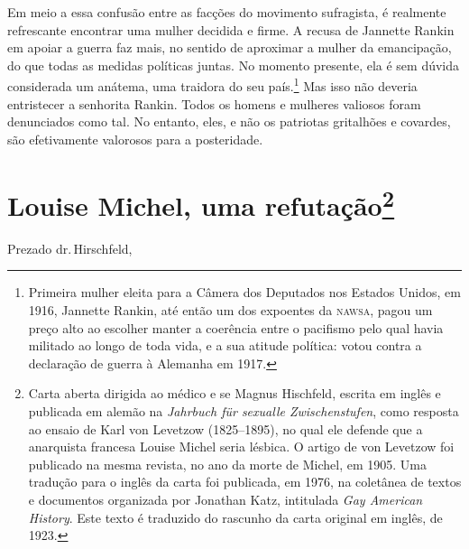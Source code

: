 Em meio a essa confusão entre as facções do movimento sufragista, é
realmente refrescante encontrar uma mulher decidida e firme. A recusa de
Jannette Rankin em apoiar a guerra faz mais, no sentido de aproximar a
mulher da emancipação, do que todas as medidas políticas juntas. No
momento presente, ela é sem dúvida considerada um anátema, uma traidora
do seu país.\footnote{Primeira mulher eleita para a Câmera dos Deputados
  nos Estados Unidos, em 1916, Jannette Rankin, até então um dos
  expoentes da \textsc{nawsa}, pagou um preço alto ao escolher manter a coerência
  entre o pacifismo pelo qual havia militado ao longo de toda vida, e a
  sua atitude política: votou contra a declaração de guerra à Alemanha
  em 1917.} Mas isso não deveria entristecer a senhorita Rankin. Todos
os homens e mulheres valiosos foram denunciados como tal. No entanto,
eles, e não os patriotas gritalhões e covardes, são efetivamente valorosos
para a posteridade.

\chapter{Louise Michel, uma refutação\footnote{Carta aberta dirigida ao médico e
  se Magnus Hischfeld, escrita em inglês e publicada em alemão na
  \emph{Jahrbuch für sexualle Zwischenstufen}, como resposta ao ensaio
  de Karl von Levetzow (1825--1895), no qual ele defende que a anarquista francesa
  Louise Michel seria lésbica. O artigo de von Levetzow foi publicado na
  mesma revista, no ano da morte de Michel, em 1905. Uma tradução para o
  inglês da carta foi publicada, em 1976, na coletânea de textos e
  documentos organizada por Jonathan Katz, intitulada \emph{Gay American
  History}. Este texto é traduzido do rascunho da carta original em
  inglês, de 1923.}}

Prezado dr.\,Hirschfeld,

\smallskip 

